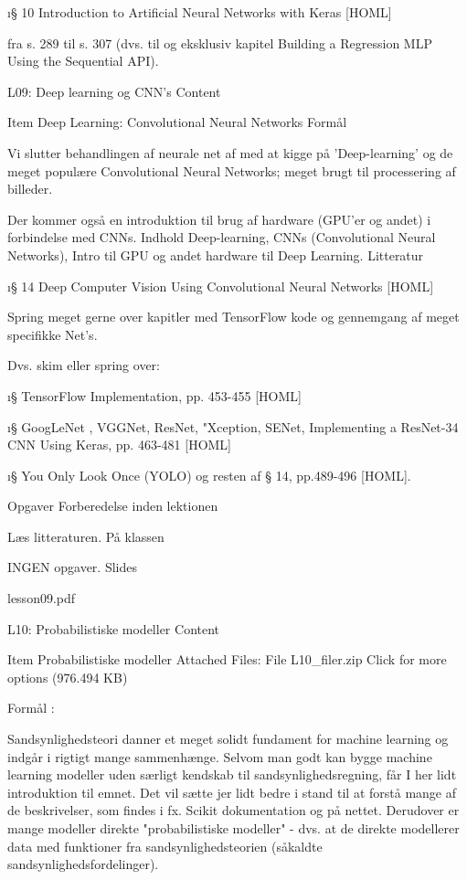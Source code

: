 \i{§ 10 Introduction to Artificial Neural Networks with Keras} [HOML]

fra s. 289 til s. 307 (dvs. til og eksklusiv kapitel Building a Regression MLP Using the Sequential API).





L09: Deep learning og CNN's
Content

    Item
    Deep Learning: Convolutional Neural Networks
    Formål

    Vi slutter behandlingen af neurale net af med at kigge på 'Deep-learning' og de meget populære Convolutional Neural Networks; meget brugt til processering af billeder.

    Der kommer også en introduktion til brug af hardware (GPU'er og andet) i forbindelse med CNNs.
    Indhold
        Deep-learning,
        CNNs (Convolutional Neural Networks),
        Intro til GPU og andet hardware til Deep Learning.
    Litteratur

    \i{§ 14 Deep Computer Vision Using Convolutional Neural Networks} [HOML]

    Spring meget gerne over kapitler med TensorFlow kode og gennemgang af meget specifikke  Net's.

    Dvs.  skim eller spring over:

    \i{§  TensorFlow Implementation},  pp. 453-455 [HOML]

    \i{§  GoogLeNet , VGGNet, ResNet, "Xception, SENet, Implementing a
    ResNet-34 CNN Using Keras}, pp.  463-481 [HOML]

    \i{§ You Only Look Once (YOLO)} og resten af § 14, pp.489-496 [HOML].
    
    Opgaver
    Forberedelse inden lektionen

    Læs litteraturen.
    På klassen

    INGEN opgaver.
    Slides

     lesson09.pdf 


 L10: Probabilistiske modeller
Content

    Item
    Probabilistiske modeller
    Attached Files:
        File L10_filer.zip Click for more options (976.494 KB) 

    Formål :

    Sandsynlighedsteori danner et meget solidt fundament for machine learning og indgår i rigtigt mange sammenhænge. Selvom man godt kan bygge machine learning modeller uden særligt kendskab til sandsynlighedsregning, får I her lidt introduktion til emnet. Det vil sætte jer lidt bedre i stand til at forstå mange af de beskrivelser, som findes i fx. Scikit dokumentation og på nettet. Derudover er mange modeller direkte "probabilistiske modeller" - dvs. at de direkte modellerer data med funktioner fra sandsynlighedsteorien (såkaldte sandsynlighedsfordelinger).


